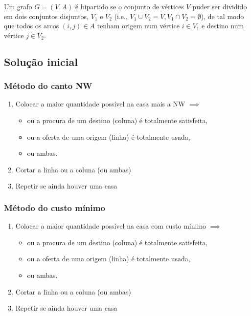 \documentclass[10pt, a4paper]{article}
\begin{document}
\begin{multicols}{2}
Um grafo \(G = (V, A)\) é bipartido se o conjunto de vértices \(V\) puder ser dividido em dois conjuntos disjuntos, \(V_1\) e \(V_2\) (i.e., \(V_1 \cup V_2 = V, V_1 \cap V_2 = \emptyset\)), de tal modo que todos os arcos \((i,j) \in A\) tenham origem num vértice \(i \in V_1\) e destino num vértice \(j \in V_2\).

%

\subsection{Solução inicial}

\subsubsection{Método do canto NW}

\begin{enumerate}
    \item Colocar a maior quantidade possível na casa mais a NW \(\implies\)
    \begin{itemize}
        \item ou a procura de um destino (coluna) é totalmente satisfeita,
        \item ou a oferta de uma origem (linha) é totalmente usada,
        \item ou ambas.
    \end{itemize}
    \item Cortar a linha ou a coluna (ou ambas)
    \item Repetir se ainda houver uma casa
\end{enumerate}

\subsubsection{Método do custo mínimo}

\begin{enumerate}
    \item Colocar a maior quantidade possível na casa com custo mínimo \(\implies\)
    \begin{itemize}
        \item ou a procura de um destino (coluna) é totalmente satisfeita,
        \item ou a oferta de uma origem (linha) é totalmente usada,
        \item ou ambas.
    \end{itemize}
    \item Cortar a linha ou a coluna (ou ambas)
    \item Repetir se ainda houver uma casa
\end{enumerate}


\end{multicols}
\end{document}
